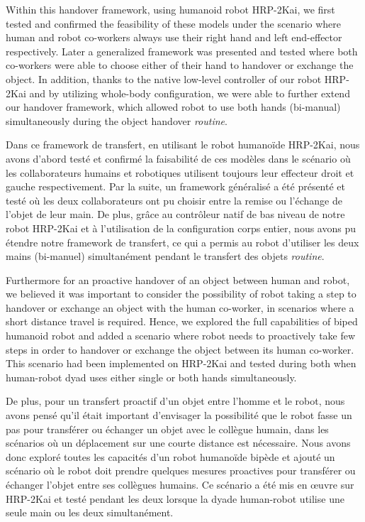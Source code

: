Within this handover framework, using humanoid robot HRP-2Kai, we first tested and confirmed the feasibility of these models under the scenario where human and robot co-workers always use their right hand and left end-effector respectively. Later a generalized framework was presented and tested where both co-workers were able to choose either of their hand to handover or exchange the object. In addition, thanks to the native low-level controller of our robot HRP-2Kai and by utilizing whole-body configuration, we were able to further extend our handover framework, which allowed robot to use both hands  (bi-manual) simultaneously during the object handover \textit{routine}.

Dans ce framework de transfert, en utilisant le robot humanoïde HRP-2Kai, nous avons d'abord testé et confirmé la faisabilité de ces modèles dans le scénario où les collaborateurs humains et robotiques utilisent toujours leur effecteur droit et gauche respectivement. Par la suite, un framework généralisé a été présenté et testé où les deux collaborateurs ont pu choisir entre la remise ou l'échange de l'objet de leur main. De plus, grâce au contrôleur natif de bas niveau de notre robot HRP-2Kai et à l'utilisation de la configuration corps entier, nous avons pu étendre notre framework de transfert, ce qui a permis au robot d'utiliser les deux mains (bi-manuel) simultanément pendant le transfert des objets \textit{routine}.


Furthermore for an proactive handover of an object between human and robot, we believed it was important to consider the possibility of robot taking a step to handover or exchange an object with the human co-worker, in scenarios where a short distance travel is required. Hence, we explored the full capabilities of biped humanoid robot and added a scenario where robot needs to proactively take few steps in order to handover or exchange the object between its human co-worker. This scenario had been implemented on HRP-2Kai and tested during both when human-robot dyad uses either single or both hands simultaneously. 

De plus, pour un transfert proactif d'un objet entre l'homme et le robot, nous avons pensé qu'il était important d'envisager la possibilité que le robot fasse un pas pour transférer ou échanger un objet avec le collègue humain, dans les scénarios où un déplacement sur une courte distance est nécessaire. Nous avons donc exploré toutes les capacités d'un robot humanoïde bipède et ajouté un scénario où le robot doit prendre quelques mesures proactives pour transférer ou échanger l'objet entre ses collègues humains. Ce scénario a été mis en œuvre sur HRP-2Kai et testé pendant les deux lorsque la dyade human-robot utilise une seule main ou les deux simultanément. 




